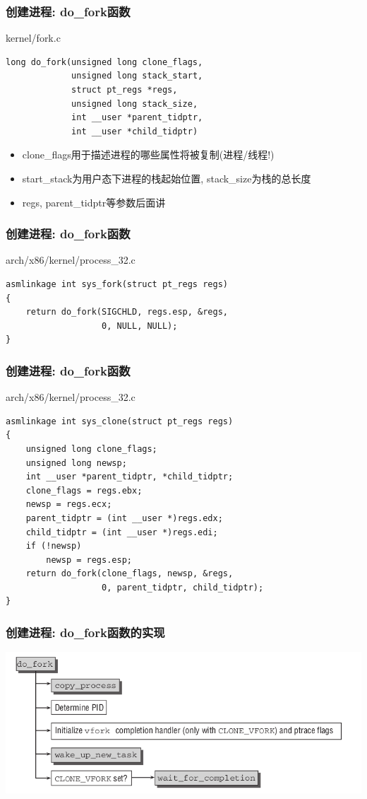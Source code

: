 \documentclass[xcolor=svgnames]{beamer}
\begin{document}
\begin{CJK*}{UTF8}{gbsn}
\begin{frame}[fragile]
\frametitle{创建进程: do\_fork函数}
\begin{block}{kernel/fork.c}
\begin{verbatim}
long do_fork(unsigned long clone_flags,
             unsigned long stack_start,
             struct pt_regs *regs,
             unsigned long stack_size,
             int __user *parent_tidptr,
             int __user *child_tidptr)
\end{verbatim}
\end{block}
\begin{itemize}
\item clone\_flags用于描述进程的哪些属性将被复制(进程/线程!)
\item start\_stack为用户态下进程的栈起始位置, stack\_size为栈的总长度
\item regs, parent\_tidptr等参数后面讲
\end{itemize}
\end{frame}

\begin{frame}[fragile]
\frametitle{创建进程: do\_fork函数}
\begin{block}{arch/x86/kernel/process\_32.c}
\begin{verbatim}
asmlinkage int sys_fork(struct pt_regs regs)
{
    return do_fork(SIGCHLD, regs.esp, &regs, 
                   0, NULL, NULL);
}
\end{verbatim}
\end{block}
\end{frame}

\begin{frame}[fragile]
\frametitle{创建进程: do\_fork函数}
\begin{block}{arch/x86/kernel/process\_32.c}
\begin{verbatim}
asmlinkage int sys_clone(struct pt_regs regs)
{
    unsigned long clone_flags;
    unsigned long newsp;
    int __user *parent_tidptr, *child_tidptr;
    clone_flags = regs.ebx;
    newsp = regs.ecx;
    parent_tidptr = (int __user *)regs.edx;
    child_tidptr = (int __user *)regs.edi;
    if (!newsp)
        newsp = regs.esp;
    return do_fork(clone_flags, newsp, &regs, 
                   0, parent_tidptr, child_tidptr);
}

\end{verbatim}
\end{block}
\end{frame}

\begin{frame}[fragile]
\frametitle{创建进程: do\_fork函数的实现}
\includegraphics[width=1.0\textwidth]{dofork.png}
\end{frame}


\end{CJK*}
\end{document}
